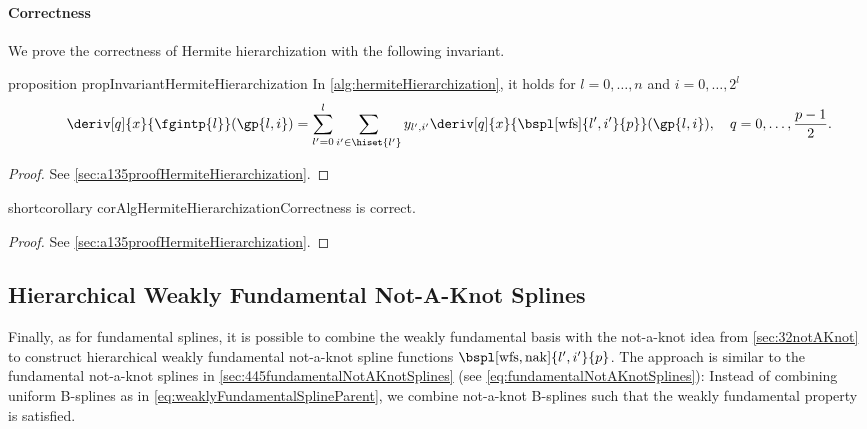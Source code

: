 \pagebreak

\paragraph{Correctness}

We prove the correctness of Hermite hierarchization
with the following invariant.

\begin{restatable}{%
  proposition%
}{%
  propInvariantHermiteHierarchization%
}
  \label{prop:invariantHermiteHierarchization}
  In \cref{alg:hermiteHierarchization}, it holds
  for $l = 0, \dotsc, n$ and $i = 0, \dotsc, 2^l$
  \begin{equation}
    \label{eq:propInvariantHermiteHierarchization}
    \deriv[q]{x}{\fgintp{l}}(\gp{l,i})
    = \sum_{l'=0}^l \sum_{i' \in \hiset{l'}}
    \linout{l',i'} \deriv[q]{x}{\bspl[\wfs]{l',i'}{p}}(\gp{l,i}),\quad
    q = 0, \dotsc, \frac{p-1}{2}.
    \hspace*{-6mm}
  \end{equation}
\end{restatable}

\begin{proof}
  See \cref{sec:a135proofHermiteHierarchization}.
\end{proof}

\begin{restatable}{%
  shortcorollary%
}{%
  corAlgHermiteHierarchizationCorrectness%
}
  \label{cor:algHermiteHierarchizationCorrectness}
   is correct.
\end{restatable}

\begin{proof}
  See \cref{sec:a135proofHermiteHierarchization}.
\end{proof}



\subsection{Hierarchical Weakly Fundamental Not-A-Knot Splines}
\label{sec:456wfsNotAKnot}

Finally, as for fundamental splines,
it is possible to combine the weakly fundamental basis
with the not-a-knot idea from \cref{sec:32notAKnot} to construct
hierarchical weakly fundamental not-a-knot spline functions
$\bspl[\wfs,\nak]{l',i'}{p}$.
The approach is similar to the fundamental not-a-knot splines
in \cref{sec:445fundamentalNotAKnotSplines}
(see \cref{eq:fundamentalNotAKnotSplines}):
Instead of combining uniform B-splines as in
\eqref{eq:weaklyFundamentalSplineParent},
we combine not-a-knot B-splines such that the
weakly fundamental property is satisfied.

